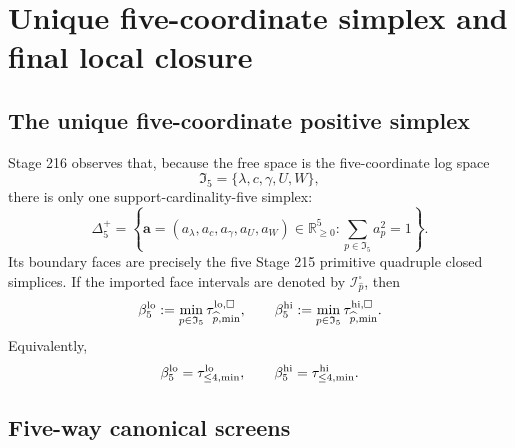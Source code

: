 
\section{Unique five-coordinate simplex and final local closure}
\label{sec:app-part06-unique-five-simplex-final-local-closure}

\subsection{The unique five-coordinate positive simplex}
\label{subsec:app-part06-unique-five-coordinate-simplex}

Stage 216 observes that, because the free space is the five-coordinate log space
\begin{equation}
\label{eq:app-part06-five-axis-set}
\mathfrak I_5=\{\lambda,c,\gamma,U,W\},
\end{equation}
there is only one support-cardinality-five simplex:
\begin{equation}
\label{eq:app-part06-five-simplex}
\Delta_5^+
=
\left\{
\mathbf a=(a_\lambda,a_c,a_\gamma,a_U,a_W)\in\mathbb R_{\ge0}^{5}:
\sum_{p\in\mathfrak I_5}a_p^2=1
\right\}.
\end{equation}
Its boundary faces are precisely the five Stage 215 primitive quadruple closed simplices.  If the imported face intervals are denoted by \(\mathcal I_{\widehat p}^{\square}\), then
\begin{equation}
\label{eq:app-part06-five-boundary-minima}
\beta_5^{\rm lo}:=\min_{p\in\mathfrak I_5}\tau_{\widehat p,\min}^{\rm lo,\square},
\qquad
\beta_5^{\rm hi}:=\min_{p\in\mathfrak I_5}\tau_{\widehat p,\min}^{\rm hi,\square}.
\end{equation}
Equivalently,
\begin{equation}
\label{eq:app-part06-five-boundary-equals-le4}
\beta_5^{\rm lo}=\tau_{\le4,\min}^{\rm lo},
\qquad
\beta_5^{\rm hi}=\tau_{\le4,\min}^{\rm hi}.
\end{equation}

\subsection{Five-way canonical screens}
\label{subsec:app-part06-five-way-canonical-screens}

